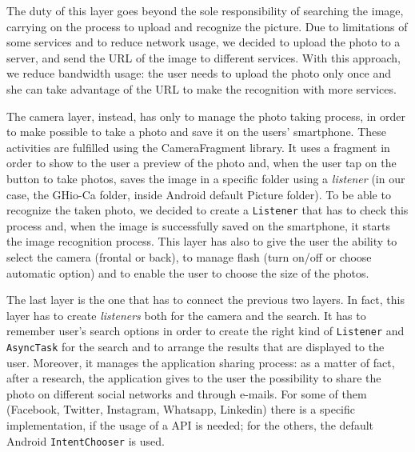 The duty of this layer goes beyond the sole responsibility of searching the 
image, carrying on the process to upload and recognize the picture.
Due to limitations of some services and to reduce network usage, we decided 
to upload the photo to a server, and send the URL of the image to different 
services.
With this approach, we reduce bandwidth usage: the user needs to upload the
photo only once and she can take advantage of the URL to make the recognition 
with more services.

The camera layer, instead, has only to manage the photo taking process, in order
to make possible to take a photo and save it on the users' smartphone. These
activities are fulfilled using the CameraFragment library. It uses a fragment
in order to show to the user a preview of the photo and, when the user tap on
the button to take photos, saves the image in a specific folder using a
\textit{listener} (in our case, the GHio-Ca folder, inside Android default Picture
folder). To be able to recognize the taken photo, we decided to create a
\texttt{Listener} that has to check this process and, when the image is 
successfully saved on the smartphone, it starts the image recognition process.
This layer has also to give the user the ability to select the camera (frontal
or back), to manage flash (turn on/off or choose automatic option) and to enable
the user to choose the size of the photos.

The last layer is the one that has to connect the previous two layers. In fact,
this layer has to create \textit{listeners} both for the camera and the search. It has
to remember user's search options in order to create the right kind of
\texttt{Listener} and \texttt{AsyncTask} for the search and to arrange the 
results that are displayed to the user. Moreover, it manages the application
sharing process: as a matter of fact, after a research, the application gives 
to the user the possibility to share the photo on different social networks and
through e-mails. For some of them (Facebook, Twitter, Instagram, Whatsapp,
Linkedin) there is a specific implementation, if the usage of a API is needed;
for the others, the default Android \texttt{IntentChooser} is used.
